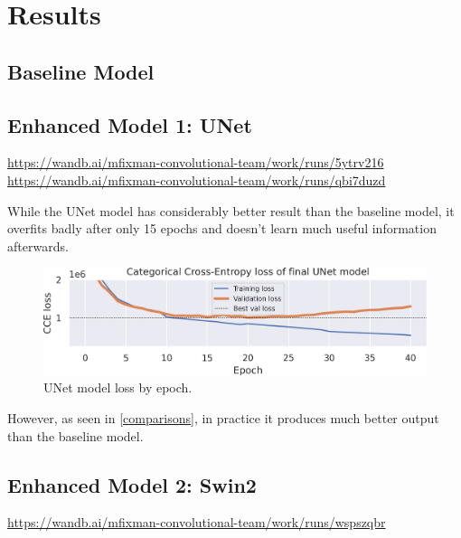 \section{Results}

\subsection{Baseline Model}

\subsection{Enhanced Model 1: UNet}
\begin{scriptsize}
	\vspace{-\parskip}
	\url{https://wandb.ai/mfixman-convolutional-team/work/runs/5ytrv216} \\[-4pt]
	\url{https://wandb.ai/mfixman-convolutional-team/work/runs/qbi7duzd}\footnotemark{}
\end{scriptsize}

While the UNet model has considerably better result than the baseline model, it overfits badly after only 15 epochs and doesn't learn much useful information afterwards.

\begin{figure}[h]
	\centering
	\includegraphics[width=.9\textwidth]{unet_loss.png}
	\caption{UNet model loss by epoch.}
\end{figure}

However, as seen in \cref{comparisons}, in practice it produces much better output than the baseline model.

\subsection{Enhanced Model 2: Swin2}
\begin{scriptsize}
	\vspace{-\parskip}
	\url{https://wandb.ai/mfixman-convolutional-team/work/runs/wspszqbr}
\end{scriptsize}

